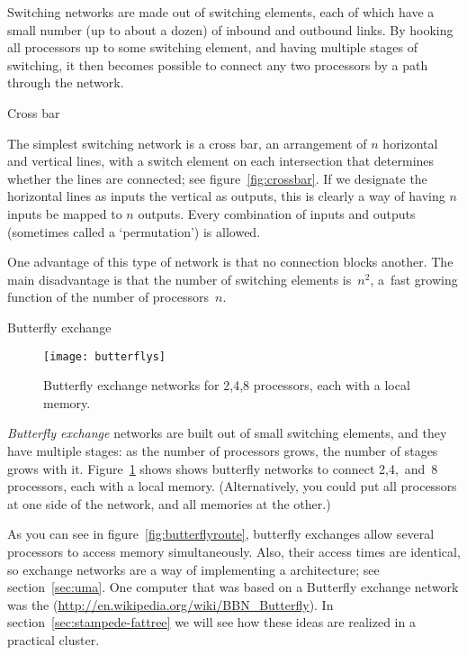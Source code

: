 Switching networks are made out of switching elements, each of which
have a small number (up to about a dozen) of inbound and outbound
links. By hooking all processors up to some switching element, and
having multiple stages of switching, it then becomes possible to
connect any two processors by a path through the network.

 {Cross bar}

\begin{notlulu}
  \crossbarfig
\end{notlulu}
%
\begin{lulu}
  \crossbarfig
\end{lulu}
%
The simplest switching network is a cross bar, an arrangement of $n$
horizontal and vertical lines, with a switch element on each
intersection that determines whether the lines are connected; see
figure~\ref{fig:crossbar}. If we designate the horizontal lines as
inputs the vertical as outputs, this is clearly a way of having $n$
inputs be mapped to $n$ outputs. Every combination of inputs and
outputs (sometimes called a `permutation') is allowed.

One advantage of this type of network is that no connection 
blocks another.
The main disadvantage  is that the number of 
switching elements is~$n^2$, a~fast growing function of the
number of processors~$n$.

 {Butterfly exchange}

\begin{figure}[ht]
  \texttt{[image: butterflys]}
  \caption{Butterfly exchange networks for 2,4,8 processors, each with
    a local memory.}
  \label{fig:butterfly}
\end{figure}

\emph{Butterfly exchange} networks are built out of small switching
elements, and they have multiple stages: as the number of processors
grows, the number of stages grows with it. Figure~\ref{fig:butterfly}
shows shows butterfly networks to connect 2,4,~and~8 processors, each
with a local memory. (Alternatively, you could put all processors at
one side of the network, and all memories at the other.)

As you can see in figure~\ref{fig:butterflyroute}, butterfly exchanges
allow several processors to access memory simultaneously. Also, their
access times are identical, so exchange networks are a way of
implementing a  architecture; see
section~\ref{sec:uma}. One computer that was based on a Butterfly
exchange network was the 
(\url{http://en.wikipedia.org/wiki/BBN_Butterfly}).  In
section~\ref{sec:stampede-fattree} we will see how these ideas are
realized in a practical cluster.

